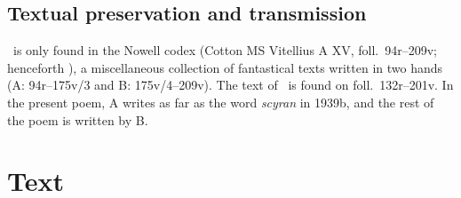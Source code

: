 \subsection{Textual preservation and transmission}

\Beowulf\ is only found in the Nowell codex (Cotton MS Vitellius A XV, foll.~94r--209v; henceforth \BeoMS), a miscellaneous collection of fantastical texts written in two hands (A: 94r--175v/3 and B: 175v/4--209v).  The text of \Beowulf\ is found on foll.~132r--201v.  In the present poem, A writes as far as the word \emph{scyran} in 1939b, and the rest of the poem is written by B.

\newpage
\section{Text}

